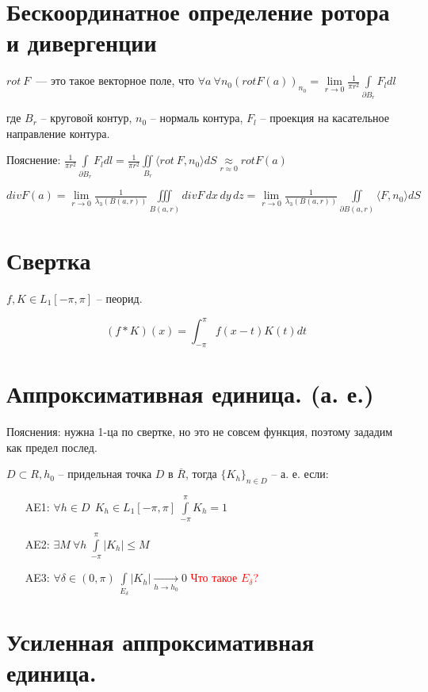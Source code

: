 \documentclass[paper=a4, fontsize=17pt]{article}
\begin{document}
	\section{Бескоординатное определение ротора и дивергенции}
	$rot\ F$~--- это такое векторное поле, что $\forall a \ \forall n_0 (rot F(a))_{n_0} = \lim\limits_{r\to 0} \frac{1}{\pi r^2} \int\limits_{\partial B_r} F_ldl$
		
	где $ B_r $ -- круговой контур, $ n_0 $ -- нормаль контура, $ F_l $ -- проекция на касательное направление контура. 

	Пояснение: $ \frac{1}{\pi r^2} \int\limits_{\partial B_r} F_ldl =  \frac{1}{\pi r^2} \iint\limits_{B_r} \langle rot\ F, n_0 \rangle dS \underset{r \approx 0}{\approx} rot F(a)$
	


	$div F(a) = \lim\limits_{r\to 0} \frac{1}{\lambda_3(B(a,r))} \iiint\limits_{B(a,r)} div F \,dx\,dy\,dz = \lim\limits_{r\to 0} \frac{1}{\lambda_3(B(a,r))} \iint\limits_{\partial B(a,r)} \langle F, n_0 \rangle dS$

	\section{Свертка}
	$ f, K \in L_1[-\pi, \pi]$  -- пеорид.

	$$ (f \ast K)(x) = \int_{-\pi}^{\pi} f(x-t)K(t) dt$$

\section{Аппроксимативная единица. (а. е.)}
	
	Пояснения: нужна 1-ца по свертке, но это не совсем функция, поэтому зададим как предел послед.
	
	$ D \subset R, h_0 $ -- придельная точка $ D $ в $ \overline{R} $, 
	тогда $ \{K_h\}_{n \in D}$ -- а. е. если:
	\begin{itemize}
		\item[AE1: ] $ \forall h \in D ~~ K_h \in L_1[-\pi, \pi] ~ \int\limits_{-\pi}^{\pi} K_h = 1 $
		\item[AE2: ] $ \exists M ~ \forall h ~ \int\limits_{-\pi}^{\pi} |K_h| \leq M $
		\item[AE3: ] $ \forall \delta \in (0, \pi) ~  \int\limits_{E_\delta} | K_h | 
		\underset{h \rightarrow h_0}{\rightarrow} 0  $
		\textcolor{red}{Что такое $E_{\delta}$?}
	\end{itemize}
	
\section{Усиленная аппроксимативная единица.}
	
\end{document}
